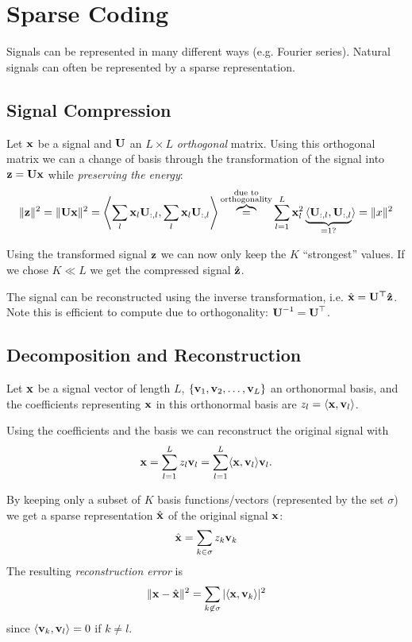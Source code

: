 \chapter{Sparse Coding}
Signals can be represented in many different ways (e.g. Fourier series). Natural signals can often be represented by a sparse representation.

\section{Signal Compression}
Let \(\boldsymbol{\mathrm{x}}\) be a signal and \(\boldsymbol{\mathrm{U}}\) an \(L \times L\) \emph{orthogonal} matrix. Using this orthogonal matrix we can a change of basis through the transformation of the signal into \(\boldsymbol{\mathrm{z}} = \boldsymbol{\mathrm{Ux}}\) while \emph{preserving the energy}:
\[
\| \boldsymbol{\mathrm{z}} \|^2 = \| \boldsymbol{\mathrm{Ux}} \|^2 = \left\langle
	\sum_{l} \boldsymbol{\mathrm{x}}_l \boldsymbol{\mathrm{U}}_{:, l},
	\sum_{l} \boldsymbol{\mathrm{x}}_l \boldsymbol{\mathrm{U}}_{:, l}
\right\rangle
\overbrace{=}^{\substack{\text{due to} \\ \text{orthogonality}}}
\sum_{l=1}^{L} \boldsymbol{\mathrm{x}}_l^2 \underbrace{\langle \boldsymbol{\mathrm{U}}_{:, l}, \boldsymbol{\mathrm{U}}_{:, l}}_{= 1?} \rangle
= \| x \|^2
\]

Using the transformed signal \(\boldsymbol{\mathrm{z}}\) we can now only keep the \(K\) ``strongest'' values. If we chose \(K \ll L\) we get the compressed signal \(\hat{\boldsymbol{\mathrm{z}}}\).

The signal can be reconstructed using the inverse transformation, i.e. \(\hat{\boldsymbol{\mathrm{x}}} = \boldsymbol{\mathrm{U^\top \hat{z}}}\). Note this is efficient to compute due to orthogonality: \(\boldsymbol{\mathrm{U}}^{-1} = \boldsymbol{\mathrm{U}}^\top\).

\section{Decomposition and Reconstruction}
Let \(\boldsymbol{\mathrm{x}}\) be a signal vector of length \(L\), \(\{\boldsymbol{\mathrm{v}}_1, \boldsymbol{\mathrm{v}}_2, \ldots, \boldsymbol{\mathrm{v}}_L\}\) an orthonormal basis, and the coefficients representing \(\boldsymbol{\mathrm{x}}\) in this orthonormal basis are \(z_l = \langle \boldsymbol{\mathrm{x}}, \boldsymbol{\mathrm{v}}_l \rangle\).

Using the coefficients and the basis we can reconstruct the original signal with
\[
\boldsymbol{\mathrm{x}} = \sum_{l=1}^L z_l \boldsymbol{\mathrm{v}}_l = \sum_{l=1}^L \langle \boldsymbol{\mathrm{x}}, \boldsymbol{\mathrm{v}}_l \rangle \boldsymbol{\mathrm{v}}_l.
\]

By keeping only a subset of \(K\) basis functions/vectors (represented by the set \(\sigma\)) we get a sparse representation \(\hat{\boldsymbol{\mathrm{x}}}\) of the original signal \(\boldsymbol{\mathrm{x}}\):
\[
\hat{\boldsymbol{\mathrm{x}}} = \sum_{k \in \sigma} z_k \boldsymbol{\mathrm{v}}_k
\]
The resulting \emph{reconstruction error} is
\[
\| \boldsymbol{\mathrm{x}} - \hat{\boldsymbol{\mathrm{x}}} \|^2 = \sum_{k \not\in \sigma} |\langle \boldsymbol{\mathrm{x}}, \boldsymbol{\mathrm{v}}_k \rangle|^2
\]
since \(\langle \boldsymbol{\mathrm{v}}_k, \boldsymbol{\mathrm{v}}_l \rangle = 0\) if \(k \neq l\).

